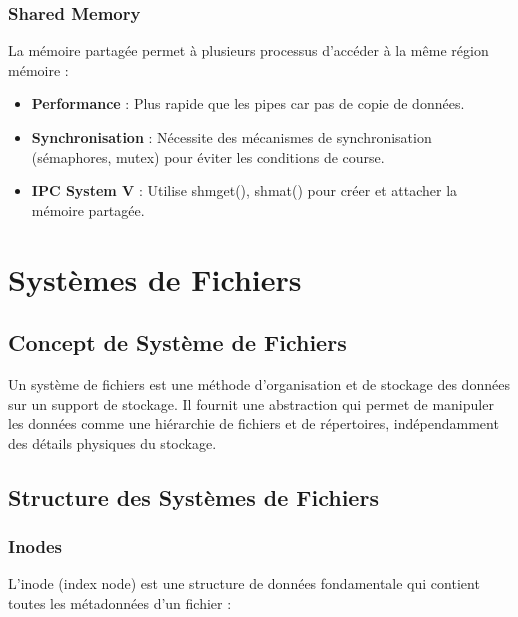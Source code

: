 \documentclass[12pt,a4paper]{article}
\begin{document}
\subsubsection{Shared Memory}
La mémoire partagée permet à plusieurs processus d'accéder à la même région mémoire :

\begin{itemize}
    \item \textbf{Performance} : Plus rapide que les pipes car pas de copie de données.
    \item \textbf{Synchronisation} : Nécessite des mécanismes de synchronisation (sémaphores, mutex) pour éviter les conditions de course.
    \item \textbf{IPC System V} : Utilise shmget(), shmat() pour créer et attacher la mémoire partagée.
\end{itemize}


\section{Systèmes de Fichiers}

\subsection{Concept de Système de Fichiers}

Un système de fichiers est une méthode d'organisation et de stockage des données sur un support de stockage. Il fournit une abstraction qui permet de manipuler les données comme une hiérarchie de fichiers et de répertoires, indépendamment des détails physiques du stockage.

\subsection{Structure des Systèmes de Fichiers}

\subsubsection{Inodes}

L'inode (index node) est une structure de données fondamentale qui contient toutes les métadonnées d'un fichier :
\end{document}
